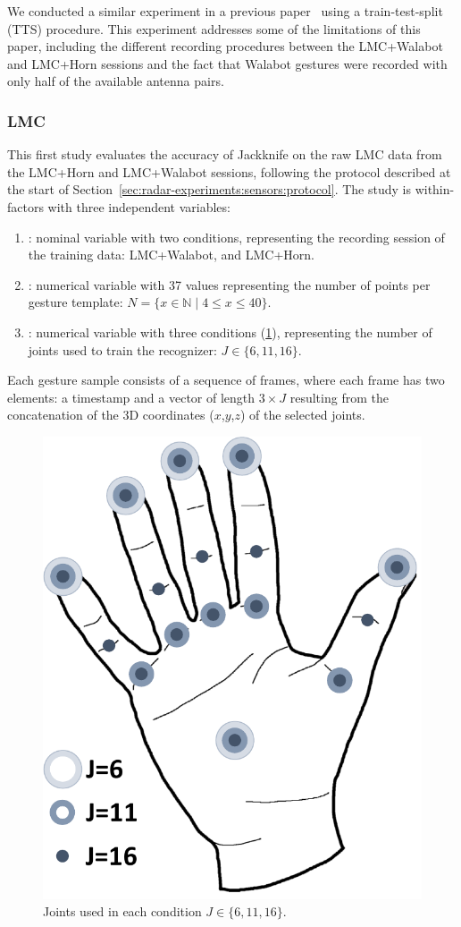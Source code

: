 We conducted a similar experiment in a previous paper~\cite{Sluyters:2022:IUI} using a train-test-split (TTS) procedure. This experiment addresses some of the limitations of this paper, including the different recording procedures between the LMC+Walabot and LMC+Horn sessions and the fact that Walabot gestures were recorded with only half of the available antenna pairs.


\subsubsection{LMC} \label{sec:radar-experiments:sensors:protocol:lmc}
This first study evaluates the accuracy of Jackknife on the raw LMC data from the LMC+Horn and LMC+Walabot sessions, following the protocol described at the start of Section~\ref{sec:radar-experiments:sensors:protocol}. The study is within-factors with three independent variables:
\begin{enumerate}
    \item {}: nominal variable with two conditions, representing the recording session of the training data: LMC+Walabot, and LMC+Horn.
    \item {}: numerical variable with 37 values representing the number of points per gesture template: $N{=}\{x\in\mathbb{N} \mid 4 \leq x \leq 40\}$.
    \item {}: numerical variable with three conditions (\fig \ref{fig:radar-experiments:lmc-joints}), representing the number of joints used to train the recognizer: $J{\in}\{6,11,16\}$. 
\end{enumerate}
Each gesture sample consists of a sequence of frames, where each frame has two elements: a timestamp and a vector of length $3 \times J$ resulting from the concatenation of the 3D coordinates ($x$,$y$,$z$) of the selected joints. 

\begin{figure}[tb]
    \centering
    \includegraphics[width=.35\linewidth]{Figures/RadarExperiments/Sensors/lmc-joints.pdf}
    \caption{Joints used in each condition $J{\in}\{6,11,16\}$.}
    \label{fig:radar-experiments:lmc-joints}
\end{figure}

